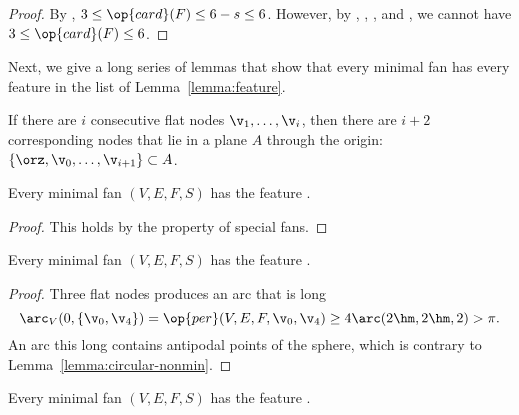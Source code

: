 \begin{proof}
  By , $3\le\op{card}(F)\le 6-s\le 6$.  However, by
  , ,
  , and , we cannot have
  $3\le\op{card}(F)\le 6$.
\end{proof}





Next, we give a long series of lemmas that show that every minimal fan
has every feature in the list of Lemma~\ref{lemma:feature}.

If there are $i$ consecutive flat nodes $\v_1,\ldots,\v_i$, then there
are $i+2$ corresponding nodes that lie in a plane $A$ through the
origin: $\{\orz,\v_0,\ldots,\v_{i+1}\}\subset A$.


\begin{lemma}[card]\label{l:c}
Every minimal fan $(V,E,F,S)$ has the feature .
\end{lemma}

\begin{proof} This holds by the property  of special fans.
\end{proof}


\begin{lemma}\label{l:ntf}
Every minimal fan $(V,E,F,S)$ has the feature .
\end{lemma}

\begin{proof}  Three flat nodes produces an arc that is long
\[ 
  \arc_V(0,\{\v_0,\v_4\}) 
= \op{per}(V,E,F,\v_0,\v_4) \ge4\arc(2\hm,2\hm,2) > \pi.
\] 
An arc this long contains antipodal points of the sphere, which is
contrary to Lemma~\ref{lemma:circular-nonmin}.
\end{proof}

\begin{lemma}\label{l:fc}
Every minimal fan $(V,E,F,S)$ has the feature .
\end{lemma}


